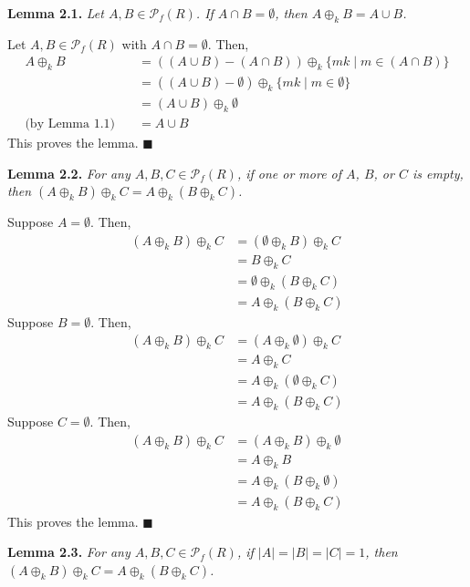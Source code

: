 \documentclass{article}
\newcommand{\abs}[1]{\left|#1\right|}
\begin{document}
\textbf{Lemma 2.1.} \textit{
    Let $A, B \in \mathcal{P}_f(R)$. If $A \cap B = \emptyset$,
    then $A \oplus_k B = A \cup B$.
}

Let $A, B \in \mathcal{P}_f(R)$ with $A \cap B = \emptyset$.
Then,
\[\begin{split}
A \oplus_k B
&= ((A \cup B) - (A \cap B))
    \oplus_k \{mk \mid m \in (A \cap B)\} \\
&= ((A \cup B) - \emptyset)
    \oplus_k \{mk \mid m \in \emptyset\} \\
&= (A \cup B) \oplus_k \emptyset \\
\text{(by Lemma 1.1)}\quad
&= A \cup B
\end{split}\]
This proves the lemma. $\blacksquare$

\textbf{Lemma 2.2.} \textit{
    For any $A, B, C \in \mathcal{P}_f(R)$,
    if one or more of $A$, $B$, or $C$ is empty,
    then
    $(A \oplus_k B) \oplus_k C
    = A \oplus_k (B \oplus_k C)$.
}

Suppose $A = \emptyset$. Then,
\[\begin{split}
    (A \oplus_k B) \oplus_k C
    &= (\emptyset \oplus_k B) \oplus_k C \\
    &= B \oplus_k C \\
    &= \emptyset \oplus_k (B \oplus_k C) \\
    &= A \oplus_k (B \oplus_k C)
\end{split}\]
Suppose $B = \emptyset$. Then,
\[\begin{split}
    (A \oplus_k B) \oplus_k C
    &= (A \oplus_k \emptyset) \oplus_k C \\
    &= A \oplus_k C \\
    &= A \oplus_k (\emptyset \oplus_k C) \\
    &= A \oplus_k (B \oplus_k C)
\end{split}\]
Suppose $C = \emptyset$. Then,
\[\begin{split}
    (A \oplus_k B) \oplus_k C
    &= (A \oplus_k B) \oplus_k \emptyset \\
    &= A \oplus_k B \\
    &= A \oplus_k (B \oplus_k \emptyset) \\
    &= A \oplus_k (B \oplus_k C)
\end{split}\]
This proves the lemma. $\blacksquare$

\textbf{Lemma 2.3.} \textit{
    For any $A, B, C \in \mathcal{P}_f(R)$,
    if $\abs{A} = \abs{B} = \abs{C} = 1$,
    then
    $(A \oplus_k B) \oplus_k C
    = A \oplus_k (B \oplus_k C)$.
}
\end{document}
